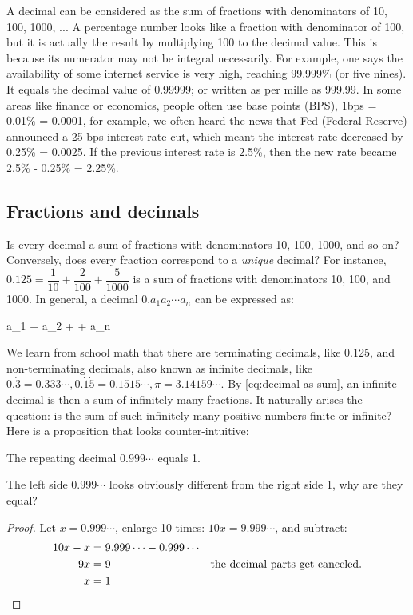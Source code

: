 \documentclass[b5paper]{article}
\begin{document}
A decimal can be considered as the sum of fractions with denominators of 10, 100, 1000, ... A percentage number looks like a fraction with denominator of 100, but it is actually the result by multiplying 100 to the decimal value. This is because its numerator may not be integral necessarily. For example, one says the availability of some internet service is very high, reaching 99.999\% (or five nines). It equals the decimal value of 0.99999; or written as per mille as 999.99\textperthousand. In some areas like finance or economics, people often use base points (BPS), 1bps = 0.01\% = 0.0001, for example, we often heard the news that Fed (Federal Reserve) announced a 25-bps interest rate cut, which meant the interest rate decreased by 0.25\% = 0.0025. If the previous interest rate is 2.5\%, then the new rate became 2.5\% - 0.25\% = 2.25\%.

\subsection{Fractions and decimals}

Is every decimal a sum of fractions with denominators 10, 100, 1000, and so on? Conversely, does every fraction correspond to a \emph{unique} decimal? For instance, $0.125=\dfrac{1}{10}+\dfrac{2}{100}+\dfrac{5}{1000}$ is a sum of fractions with denominators 10, 100, and 1000. In general, a decimal $0.a_1a_2\cdots a_n$ can be expressed as:

\be
a_1  + a_2  + \cdots + a_n 
\label{eq:decimal-as-sum}
\ee

We learn from school math that there are terminating decimals, like 0.125, and non-terminating decimals, also known as infinite decimals, like $0.\dot{3} = 0.333\cdots, 0.\dot{1}\dot{5} = 0.1515\cdots, \pi = 3.14159\cdots$. By \cref{eq:decimal-as-sum}, an infinite decimal is then a sum of infinitely many fractions. It naturally arises the question: is the sum of such infinitely many positive numbers finite or infinite? Here is a proposition that looks counter-intuitive:

\begin{lemma} \label{th:cycle-of-9}
  The repeating decimal $0.999\cdots$ equals 1.
\end{lemma}

The left side $0.999\cdots$ looks obviously different from the right side 1, why are they equal?

\begin{proof}
  Let $x = 0.999\cdots$, enlarge 10 times: $10x = 9.999\cdots$, and subtract:
  \begin{align*}
    10x - x &= 9.999\cdots - 0.999\cdots && \\
         9x &= 9 & \text{the decimal parts get canceled.} & \\
          x &= 1  && \qedhere
  \end{align*}
\end{proof}
\end{document}
